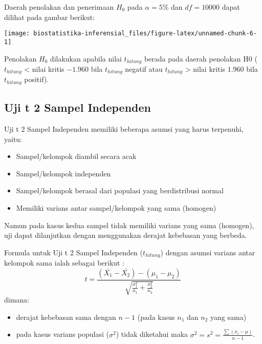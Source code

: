 \documentclass[
]{book}
\providecommand{\tightlist}{%
  \setlength{\itemsep}{0pt}\setlength{\parskip}{0pt}}
\begin{document}
Daerah penolakan dan penerimaan \(H_0\) pada \(\alpha = 5\%\) dan \(df = 10000\) dapat dilihat pada gambar berikut:

\begin{center}\texttt{[image: biostatistika-inferensial\_files/figure-latex/unnamed-chunk-6-1]} \end{center}

Penolakan \(H_0\) dilakukan apabila nilai \(t_{hitung}\) berada pada daerah penolakan H0 (\(t_{hitung}\) \textless{} nilai kritis \(-1.960\) bila \(t_{hitung}\) negatif atau \(t_{hitung}\) \textgreater{} nilai kritis \(1.960\) bila \(t_{hitung}\) positif).

\hypertarget{uji-t-2-sampel-independen}{%
\subsection{Uji t 2 Sampel Independen}\label{uji-t-2-sampel-independen}}

Uji t 2 Sampel Independen memiliki beberapa asumsi yang harus terpenuhi, yaitu:

\begin{itemize}
\tightlist
\item
  Sampel/kelompok diambil secara acak
\item
  Sampel/kelompok independen
\item
  Sampel/kelompok berasal dari populasi yang berdistribusi normal
\item
  Memiliki varians antar sampel/kelompok yang sama (homogen)
\end{itemize}

Namun pada kasus kedua sampel tidak memiliki varians yang sama (homogen), uji dapat dilanjutkan dengan menggunakan derajat kebebasan yang berbeda.

Formula untuk Uji t 2 Sampel Independen (\(t_{hitung}\)) dengan asumsi varians antar kelompok sama ialah sebagai berikut \citep{allan18}:
\[
t = \frac{(\bar{X_1}-\bar{X_2})-(\mu_1-\mu_2)}{\sqrt{\frac{\sigma_1^2}{n_1}+\frac{\sigma_2^2}{n_2}}}
\]
dimana:

\begin{itemize}
\tightlist
\item
  derajat kebebasan sama dengan \(n-1\) (pada kasus \(n_1\) dan \(n_2\) yang sama)
\item
  pada kasus varians populasi (\(\sigma^2\)) tidak diketahui maka \(\sigma^2 = s^2 = \frac{\sum(x_i-\mu)}{n-1}\).
\end{itemize}
\end{document}
